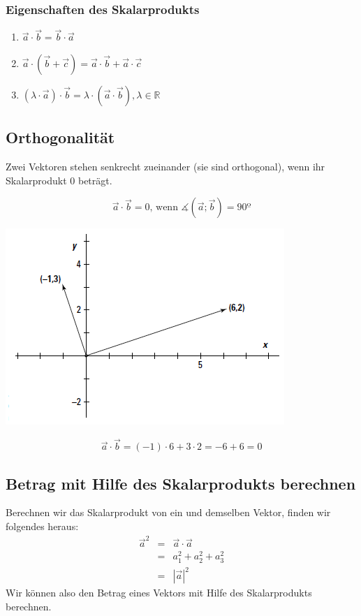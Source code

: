 \subsubsection{Eigenschaften des Skalarprodukts}
\begin{enumerate}
	\item $\vec{a} \cdot \vec{b} = \vec{b}\cdot \vec{a}$
	\item $\vec{a} \cdot (\vec{b}+\vec{c}) = \vec{a} \cdot \vec{b} + \vec{a} \cdot \vec{c}$
	\item $(\lambda \cdot \vec{a}) \cdot \vec{b} = \lambda \cdot (\vec{a} \cdot \vec{b}),  \lambda \in \mathbb{R}$
\end{enumerate}
\subsection{Orthogonalität}
\begin{mydef}Zwei Vektoren stehen senkrecht zueinander (sie sind orthogonal), wenn ihr Skalarprodukt 0 beträgt.\end{mydef}
\begin{equation*}\vec{a}\cdot \vec{b} = 0 \mbox{, wenn } \measuredangle (\vec{a};\vec{b})=90º\end{equation*}
\begin{center}\includegraphics[scale=0.85]{imgs/Orthogonalitaet.png}\end{center}
\begin{equation*}
\vec{a} \cdot \vec{b} = (-1) \cdot 6 + 3 \cdot 2 = -6 + 6 = 0
\end{equation*}
\subsection{Betrag mit Hilfe des Skalarprodukts berechnen}
Berechnen wir das Skalarprodukt von ein und demselben Vektor, finden wir folgendes heraus:
\begin{eqnarray*}\vec{a}^2&=&\vec{a}\cdot \vec{a}\\
 &=& a_{1}^{2} + a_{2}^{2} + a_{3}^{2} \\
 &=& |\vec{a}|^2\end{eqnarray*}
Wir können also den Betrag eines Vektors mit Hilfe des Skalarprodukts berechnen. 
